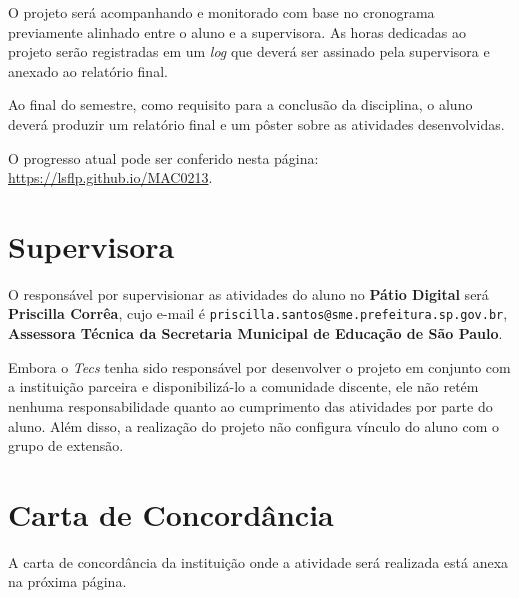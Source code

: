 \documentclass{article}
\begin{document}
O projeto será acompanhando e monitorado com base no cronograma previamente alinhado entre o aluno e a supervisora. As horas dedicadas ao projeto serão registradas em um \textit{log} que deverá ser assinado pela supervisora e anexado ao relatório final.

Ao final do semestre, como requisito para a conclusão da disciplina, o aluno deverá produzir um relatório final e um pôster sobre as atividades desenvolvidas.

O progresso atual pode ser conferido nesta página: \url{https://lsflp.github.io/MAC0213}.

\section{Supervisora}

O responsável por supervisionar as atividades do aluno  no \textbf{Pátio Digital} será \textbf{Priscilla Corrêa}, cujo e-mail é \texttt{priscilla.santos@sme.prefeitura.sp.gov.br}, \textbf{Assessora Técnica da Secretaria Municipal de Educação de São Paulo}.

Embora o \textit{Tecs} tenha sido responsável por desenvolver o projeto em conjunto com a instituição parceira e disponibilizá-lo a comunidade discente, ele não retém nenhuma responsabilidade quanto ao cumprimento das atividades por parte do aluno. Além disso, a realização do projeto não configura vínculo do aluno com o grupo de extensão.

\section{Carta de Concordância}

A carta de concordância da instituição onde a atividade será realizada está anexa na próxima página.


\end{document}
